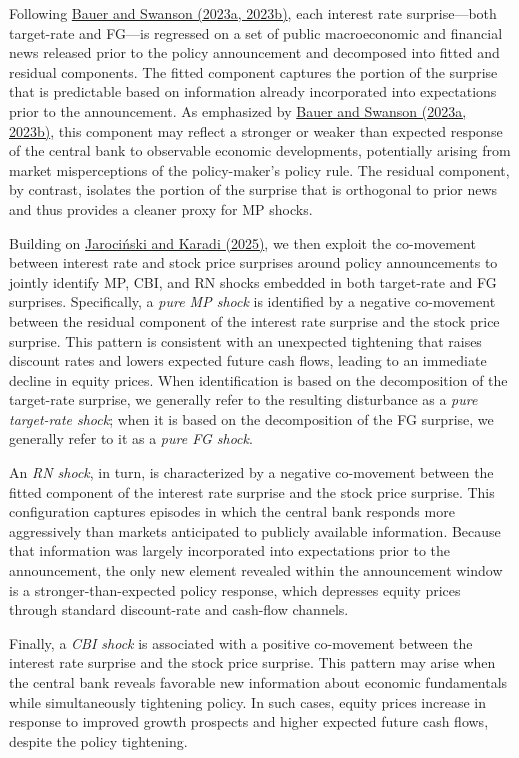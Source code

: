 \documentclass[\latexroot/\projectname]{subfiles}
\begin{document}
Following \hyperlink{Bauer and Swanson (2023a, 2023b)}{Bauer and Swanson (2023a, 2023b)}, each interest rate surprise—both target-rate and FG—is regressed on a set of public macroeconomic and financial news released prior to the policy announcement and decomposed into fitted and residual components. The fitted component captures the portion of the surprise that is predictable based on information already incorporated into expectations prior to the announcement. As emphasized by \hyperlink{Bauer and Swanson (2023a, 2023b)}{Bauer and Swanson (2023a, 2023b)}, this component may reflect a stronger or weaker than expected response of the central bank to observable economic developments, potentially arising from market misperceptions of the policy-maker's policy rule. The residual component, by contrast, isolates the portion of the surprise that is orthogonal to prior news and thus provides a cleaner proxy for MP shocks.

Building on \hyperlink{Jarociński and Karadi (2025)}{Jarociński and Karadi (2025)}, we then exploit the co-movement between interest rate and stock price surprises around policy announcements to jointly identify MP, CBI, and RN shocks embedded in both target-rate and FG surprises. Specifically, a \emph{pure MP shock} is identified by a negative co-movement between the residual component of the interest rate surprise and the stock price surprise. This pattern is consistent with an unexpected tightening that raises discount rates and lowers expected future cash flows, leading to an immediate decline in equity prices. When identification is based on the decomposition of the target-rate surprise, we generally refer to the resulting disturbance as a \emph{pure target-rate shock}; when it is based on the decomposition of the FG surprise, we generally refer to it as a \emph{pure FG shock}.

An \emph{RN shock}, in turn, is characterized by a negative co-movement between the fitted component of the interest rate surprise and the stock price surprise. This configuration captures episodes in which the central bank responds more aggressively than markets anticipated to publicly available information. Because that information was largely incorporated into expectations prior to the announcement, the only new element revealed within the announcement window is a stronger-than-expected policy response, which depresses equity prices through standard discount-rate and cash-flow channels.

Finally, a \emph{CBI shock} is associated with a positive co-movement between the interest rate surprise and the stock price surprise. This pattern may arise when the central bank reveals favorable new information about economic fundamentals while simultaneously tightening policy. In such cases, equity prices increase in response to improved growth prospects and higher expected future cash flows, despite the policy tightening.
\end{document}
